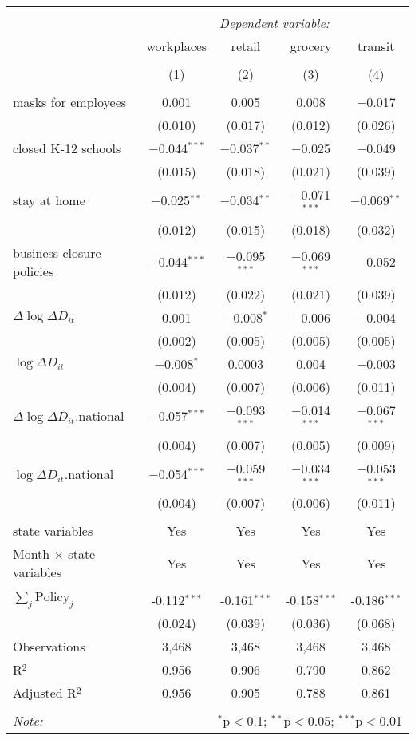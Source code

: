 \begin{tabular}{@{\extracolsep{1pt}}lcccc} 
\\[-1.8ex]\hline 
\hline \\[-1.8ex] 
 & \multicolumn{4}{c}{\textit{Dependent variable:}} \\ 
\cline{2-5} 
 & workplaces & retail & grocery & transit \\ 
\\[-1.8ex] & (1) & (2) & (3) & (4)\\ 
\hline \\[-1.8ex] 
 masks for employees & 0.001 & 0.005 & 0.008 & $-$0.017 \\ 
  & (0.010) & (0.017) & (0.012) & (0.026) \\ 
  closed K-12 schools & $-$0.044$^{***}$ & $-$0.037$^{**}$ & $-$0.025 & $-$0.049 \\ 
  & (0.015) & (0.018) & (0.021) & (0.039) \\ 
  stay at home & $-$0.025$^{**}$ & $-$0.034$^{**}$ & $-$0.071$^{***}$ & $-$0.069$^{**}$ \\ 
  & (0.012) & (0.015) & (0.018) & (0.032) \\ 
  business closure policies & $-$0.044$^{***}$ & $-$0.095$^{***}$ & $-$0.069$^{***}$ & $-$0.052 \\ 
  & (0.012) & (0.022) & (0.021) & (0.039) \\ 
  $\Delta \log \Delta D_{it}$ & 0.001 & $-$0.008$^{*}$ & $-$0.006 & $-$0.004 \\ 
  & (0.002) & (0.005) & (0.005) & (0.005) \\ 
  $\log \Delta D_{it}$ & $-$0.008$^{*}$ & 0.0003 & 0.004 & $-$0.003 \\ 
  & (0.004) & (0.007) & (0.006) & (0.011) \\ 
  $\Delta \log \Delta D_{it}$.national & $-$0.057$^{***}$ & $-$0.093$^{***}$ & $-$0.014$^{***}$ & $-$0.067$^{***}$ \\ 
  & (0.004) & (0.007) & (0.005) & (0.009) \\ 
  $\log \Delta D_{it}$.national & $-$0.054$^{***}$ & $-$0.059$^{***}$ & $-$0.034$^{***}$ & $-$0.053$^{***}$ \\ 
  & (0.004) & (0.007) & (0.006) & (0.011) \\ 
 \hline \\[-1.8ex] 
state variables & Yes & Yes & Yes & Yes \\ 
Month $\times$ state variables & Yes & Yes & Yes & Yes \\ 
\hline \\[-1.8ex] 
$\sum_j \mathrm{Policy}_j$ & -0.112$^{***}$ & -0.161$^{***}$ & -0.158$^{***}$ & -0.186$^{***}$ \\ 
 & (0.024) & (0.039) & (0.036) & (0.068) \\ 
Observations & 3,468 & 3,468 & 3,468 & 3,468 \\ 
R$^{2}$ & 0.956 & 0.906 & 0.790 & 0.862 \\ 
Adjusted R$^{2}$ & 0.956 & 0.905 & 0.788 & 0.861 \\ 
\hline 
\hline \\[-1.8ex] 
\textit{Note:}  & \multicolumn{4}{r}{$^{*}$p$<$0.1; $^{**}$p$<$0.05; $^{***}$p$<$0.01} \\ 
\end{tabular} 